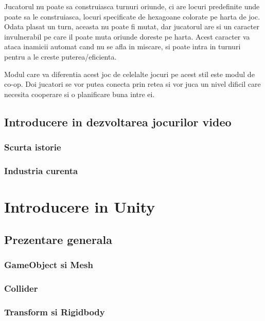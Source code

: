\documentclass[12pt, a4paper]{article}
\begin{document}
	Jucatorul nu poate sa construiasca turnuri oriunde, ci are locuri predefinite unde poate sa le construiasca, locuri specificate de hexagoane colorate pe harta de joc. Odata plasat un turn, aceasta nu poate fi mutat, dar jucatorul are si un caracter invulnerabil pe care il poate muta oriunde doreste pe harta. Acest caracter va ataca inamicii automat cand nu se afla in miscare, si poate intra in turnuri pentru a le creste puterea/eficienta.
	
	Modul care va diferentia acest joc de celelalte jocuri pe acest stil este modul de co-op. Doi jucatori se vor putea conecta prin retea si vor juca un nivel dificil care necesita cooperare si o planificare buna intre ei.
	
	\subsection{Introducere in dezvoltarea jocurilor video}
	
	\subsubsection{Scurta istorie}
	
	\subsubsection{Industria curenta}
	
	
	
	\section{Introducere in Unity}
	
	\subsection{Prezentare generala}
	
	
	\subsubsection{GameObject si Mesh}
	
	\subsubsection{Collider}
	
	\subsubsection{Transform si Rigidbody}
	
\end{document}
